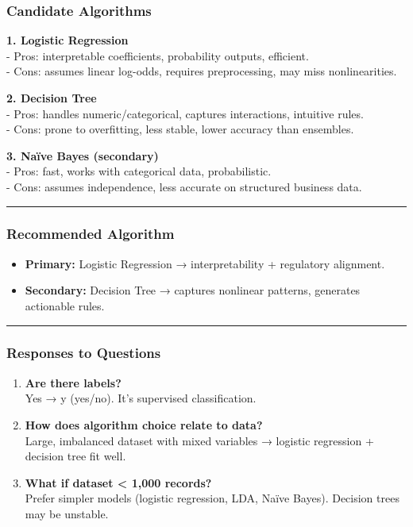 \documentclass[
]{article}
\providecommand{\tightlist}{%
  \setlength{\itemsep}{0pt}\setlength{\parskip}{0pt}}
\begin{document}
\subsubsection{Candidate Algorithms}\label{candidate-algorithms}

\textbf{1. Logistic Regression}\\
- Pros: interpretable coefficients, probability outputs, efficient.\\
- Cons: assumes linear log-odds, requires preprocessing, may miss
nonlinearities.

\textbf{2. Decision Tree}\\
- Pros: handles numeric/categorical, captures interactions, intuitive
rules.\\
- Cons: prone to overfitting, less stable, lower accuracy than
ensembles.

\textbf{3. Naïve Bayes (secondary)}\\
- Pros: fast, works with categorical data, probabilistic.\\
- Cons: assumes independence, less accurate on structured business data.

\begin{center}\rule{0.5\linewidth}{0.5pt}\end{center}

\subsubsection{Recommended Algorithm}\label{recommended-algorithm}

\begin{itemize}
\tightlist
\item
  \textbf{Primary:} Logistic Regression → interpretability + regulatory
  alignment.\\
\item
  \textbf{Secondary:} Decision Tree → captures nonlinear patterns,
  generates actionable rules.
\end{itemize}

\begin{center}\rule{0.5\linewidth}{0.5pt}\end{center}

\subsubsection{Responses to Questions}\label{responses-to-questions}

\begin{enumerate}
\def\labelenumi{\arabic{enumi}.}
\item
  \textbf{Are there labels?}\\
  Yes → y (yes/no). It's supervised classification.
\item
  \textbf{How does algorithm choice relate to data?}\\
  Large, imbalanced dataset with mixed variables → logistic regression +
  decision tree fit well.
\item
  \textbf{What if dataset \textless{} 1,000 records?}\\
  Prefer simpler models (logistic regression, LDA, Naïve Bayes).
  Decision trees may be unstable.
\end{enumerate}
\end{document}
